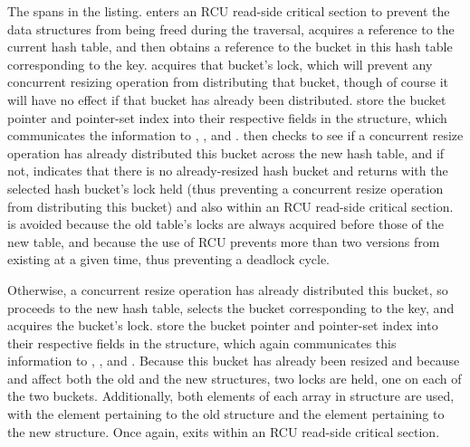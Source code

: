 \begin{fcvref}
The  spans
 in the listing.
 enters an RCU read-side critical section to prevent
the data structures from being freed during the traversal,
 acquires a reference to the current hash table, and then
 obtains a reference to the bucket in this hash table
corresponding to the key.
 acquires that bucket's lock, which will prevent any concurrent
resizing operation from distributing that bucket, though of course it
will have no effect if that bucket has already been distributed.
 store the bucket pointer and
pointer-set index into their respective fields in the
 structure, which communicates the information to
, , and .
 then checks to see if a concurrent resize
operation has already distributed this bucket across the new hash table,
and if not,  indicates that there is no
already-resized hash bucket and
 returns with the selected hash bucket's
lock held (thus preventing a concurrent resize operation from distributing
this bucket) and also within an RCU read-side critical section.
 is avoided because the old table's locks are always acquired
before those of the new table, and because the use of RCU prevents more
than two versions from existing at a given time, thus preventing a
deadlock cycle.

Otherwise, a concurrent resize operation has already distributed this
bucket, so  proceeds to the new hash table,
 selects the bucket corresponding to the key,
and  acquires the bucket's lock.
 store the bucket pointer and
pointer-set index into their respective fields in the
 structure, which again communicates this information to
, , and .
Because this bucket has already been resized and because
 and  affect both the old and the
new  structures, two locks are held, one on each of the
two buckets.
Additionally, both elements of each array in  structure
are used, with the \co{[0]} element pertaining to the old 
structure and the \co{[1]} element pertaining to the new structure.
Once again,  exits within an RCU read-side critical
section.
\end{fcvref}

